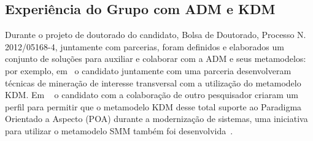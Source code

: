 \documentclass[12pt]{article}
\begin{document}


\subsection{Experiência do Grupo com ADM e KDM}

Durante o projeto de doutorado do candidato, Bolsa de Doutorado, Processo N. 2012/05168-4, juntamente com parcerias, foram definidos e elaborados um conjunto de soluções para auxiliar e colaborar com a ADM e seus metamodelos: por exemplo, em~\cite{dani_san_tool, dani_san, daniel_san_journal} o candidato juntamente com uma parceria desenvolveram técnicas de mineração de interesse transversal com a utilização do metamodelo KDM. Em ~\cite{Santos_2014, santo_wmod} o candidato com a colaboração de outro pesquisador criaram um perfil para permitir que o metamodelo KDM desse total suporte ao Paradigma Orientado a Aspecto (POA) durante a modernização de sistemas, uma iniciativa para utilizar o metamodelo SMM também foi desenvolvida~\cite{honda_dissertacao}. 
\end{document}
